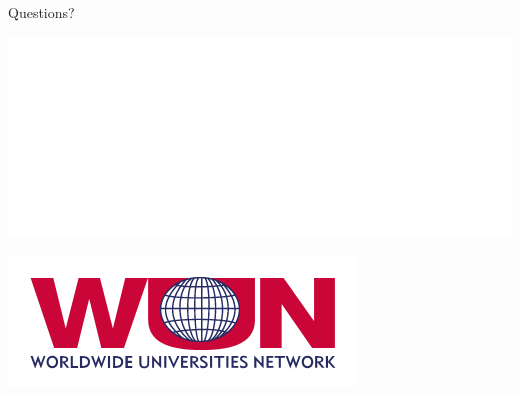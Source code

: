 \documentclass{sotonbeamer}
\begin{document}
\begin{frame}{}
  \begin{center}
      \Large Questions?
  \end{center}
\vspace{7mm}
\begin{center}
  \hspace{6mm}
  \includegraphics[width=0.3\linewidth]{sponsors/sponsor-wo.eps}

  {\includegraphics[width=0.3\linewidth]{sponsors/wun.png}}
\end{center}
\end{frame}

\appendix
\end{document}
